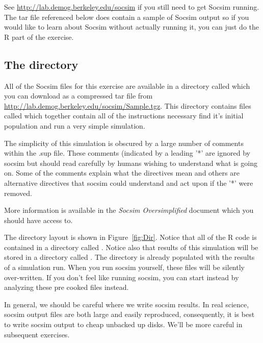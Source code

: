 See \url{http://lab.demog.berkeley.edu/socsim} if you still need to get
Socsim running.  The tar file referenced below does contain a sample
of Socsim output so if you would like to learn about Socsim without
actually running it, you can just do the R part of the exercise. 

\subsection{The  directory}
\label{sec:running-socsim-1}


All of the Socsim files for this exercise are available in a directory
called  which you can download as a compressed tar file
from \url{http://lab.demog.berkeley.edu/socsim/Sample.tgz}.  This
directory contains files called  
which together contain all of the instructions necessary find it's
initial population and run a very simple simulation.

The simplicity of this simulation is obscured by a large number of
comments within the .sup file.  These comments (indicated by a leading
'*' are ignored by socsim but should read carefully by humans wishing
to understand what is going on. Some of the comments explain what the
directives mean and others are alternative directives that socsim
could understand and act upon if the '*' were removed.

More information is available in the \emph{Socsim Oversimplified} document which you should have access to.


The  directory layout is shown in
Figure~\ref{fig:Dir}. Notice that all of the R code is contained in a
directory called . Notice also that results of this
simulation will be stored in a directory called .
The  directory is already populated with the results
of a simulation run. When you run socsim yourself, these files will be
silently over-written. If you don't feel like running socsim, you can
start instead by analyzing these pre cooked files instead.

In general, we should be careful where we write socsim results. In
real science, socsim output files are both large and easily
reproduced, consequently, it is best to write socsim output to cheap
unbacked up disks. We'll be more careful in subsequent exercises.



